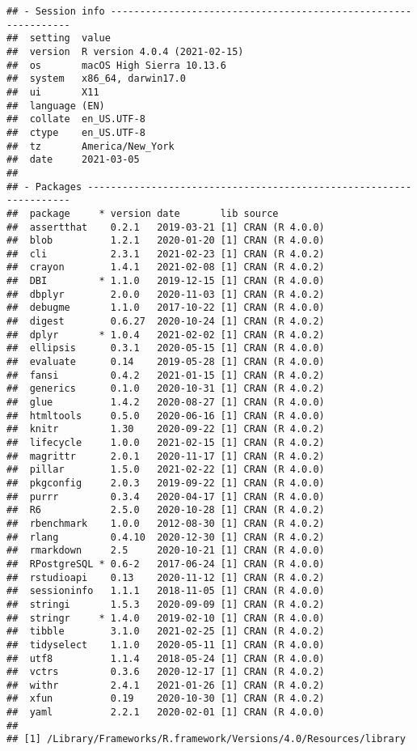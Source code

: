 \documentclass[
]{article}
\begin{document}
\begin{verbatim}
## - Session info ---------------------------------------------------------------
##  setting  value                       
##  version  R version 4.0.4 (2021-02-15)
##  os       macOS High Sierra 10.13.6   
##  system   x86_64, darwin17.0          
##  ui       X11                         
##  language (EN)                        
##  collate  en_US.UTF-8                 
##  ctype    en_US.UTF-8                 
##  tz       America/New_York            
##  date     2021-03-05                  
## 
## - Packages -------------------------------------------------------------------
##  package     * version date       lib source        
##  assertthat    0.2.1   2019-03-21 [1] CRAN (R 4.0.0)
##  blob          1.2.1   2020-01-20 [1] CRAN (R 4.0.0)
##  cli           2.3.1   2021-02-23 [1] CRAN (R 4.0.2)
##  crayon        1.4.1   2021-02-08 [1] CRAN (R 4.0.2)
##  DBI         * 1.1.0   2019-12-15 [1] CRAN (R 4.0.0)
##  dbplyr        2.0.0   2020-11-03 [1] CRAN (R 4.0.2)
##  debugme       1.1.0   2017-10-22 [1] CRAN (R 4.0.0)
##  digest        0.6.27  2020-10-24 [1] CRAN (R 4.0.2)
##  dplyr       * 1.0.4   2021-02-02 [1] CRAN (R 4.0.2)
##  ellipsis      0.3.1   2020-05-15 [1] CRAN (R 4.0.0)
##  evaluate      0.14    2019-05-28 [1] CRAN (R 4.0.0)
##  fansi         0.4.2   2021-01-15 [1] CRAN (R 4.0.2)
##  generics      0.1.0   2020-10-31 [1] CRAN (R 4.0.2)
##  glue          1.4.2   2020-08-27 [1] CRAN (R 4.0.0)
##  htmltools     0.5.0   2020-06-16 [1] CRAN (R 4.0.0)
##  knitr         1.30    2020-09-22 [1] CRAN (R 4.0.2)
##  lifecycle     1.0.0   2021-02-15 [1] CRAN (R 4.0.2)
##  magrittr      2.0.1   2020-11-17 [1] CRAN (R 4.0.2)
##  pillar        1.5.0   2021-02-22 [1] CRAN (R 4.0.0)
##  pkgconfig     2.0.3   2019-09-22 [1] CRAN (R 4.0.0)
##  purrr         0.3.4   2020-04-17 [1] CRAN (R 4.0.0)
##  R6            2.5.0   2020-10-28 [1] CRAN (R 4.0.2)
##  rbenchmark    1.0.0   2012-08-30 [1] CRAN (R 4.0.2)
##  rlang         0.4.10  2020-12-30 [1] CRAN (R 4.0.2)
##  rmarkdown     2.5     2020-10-21 [1] CRAN (R 4.0.0)
##  RPostgreSQL * 0.6-2   2017-06-24 [1] CRAN (R 4.0.0)
##  rstudioapi    0.13    2020-11-12 [1] CRAN (R 4.0.2)
##  sessioninfo   1.1.1   2018-11-05 [1] CRAN (R 4.0.0)
##  stringi       1.5.3   2020-09-09 [1] CRAN (R 4.0.2)
##  stringr     * 1.4.0   2019-02-10 [1] CRAN (R 4.0.0)
##  tibble        3.1.0   2021-02-25 [1] CRAN (R 4.0.2)
##  tidyselect    1.1.0   2020-05-11 [1] CRAN (R 4.0.0)
##  utf8          1.1.4   2018-05-24 [1] CRAN (R 4.0.0)
##  vctrs         0.3.6   2020-12-17 [1] CRAN (R 4.0.2)
##  withr         2.4.1   2021-01-26 [1] CRAN (R 4.0.2)
##  xfun          0.19    2020-10-30 [1] CRAN (R 4.0.2)
##  yaml          2.2.1   2020-02-01 [1] CRAN (R 4.0.0)
## 
## [1] /Library/Frameworks/R.framework/Versions/4.0/Resources/library
\end{verbatim}
\end{document}
